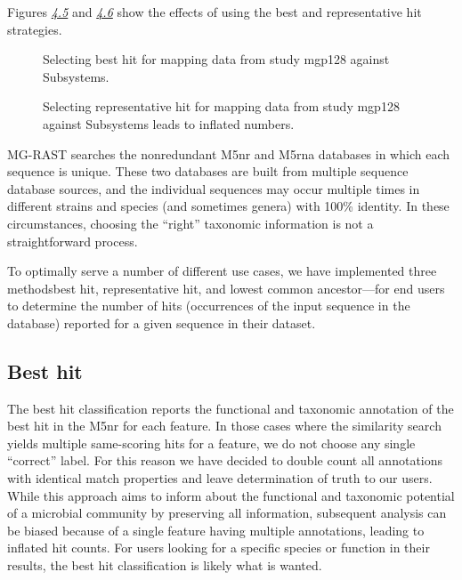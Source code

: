\documentclass[letterpaper,10pt,english]{sphinxmanual}
\begin{document}
Figures {\hyperref[\detokenize{user_manual:fig:UI-analysis-representative-hit}]{\emph{4.5}}} and
{\hyperref[\detokenize{user_manual:fig:UI-analysis-best-hit}]{\emph{4.6}}} show the effects of using the best
and representative hit strategies.

\begin{figure}[htbp]
\centering
\capstart

\noindent{}
\caption{Selecting best hit for mapping data from study mgp128 against
Subsystems.}\label{\detokenize{user_manual:fig-ui-analysis-representative-hit}}\end{figure}

\begin{figure}[htbp]
\centering
\capstart

\noindent{}
\caption{Selecting representative hit for mapping data from study mgp128
against Subsystems leads to inflated numbers.}\label{\detokenize{user_manual:fig-ui-analysis-best-hit}}\end{figure}

MG-RAST searches the nonredundant M5nr and M5rna databases in which each
sequence is unique. These two databases are built from multiple sequence
database sources, and the individual sequences may occur multiple times
in different strains and species (and sometimes genera) with 100\%
identity. In these circumstances, choosing the “right” taxonomic
information is not a straightforward process.

To optimally serve a number of different use cases, we have implemented
three methods\textendash{}best hit, representative hit, and lowest common
ancestor—for end users to determine the number of hits (occurrences of
the input sequence in the database) reported for a given sequence in
their dataset.


\subsection{Best hit}
\label{\detokenize{user_manual:best-hit}}
The best hit classification reports the functional and taxonomic
annotation of the best hit in the M5nr for each feature. In those cases
where the similarity search yields multiple same-scoring hits for a
feature, we do not choose any single “correct” label. For this reason we
have decided to double count all annotations with identical match
properties and leave determination of truth to our users. While this
approach aims to inform about the functional and taxonomic potential of
a microbial community by preserving all information, subsequent analysis
can be biased because of a single feature having multiple annotations,
leading to inflated hit counts. For users looking for a specific species
or function in their results, the best hit classification is likely what
is wanted.
\end{document}
